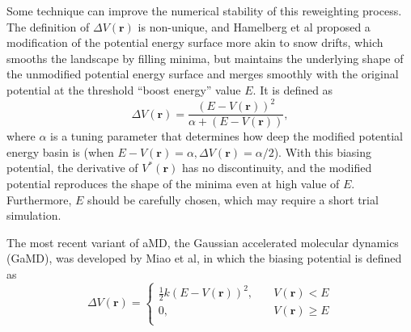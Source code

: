 Some technique can improve the numerical stability of this reweighting process.\cite{MiaoJCTC2014} The definition of $\Delta V(\mathbf{r})$ is non-unique, and Hamelberg et al proposed a modification of the potential energy surface more akin to snow drifts, which smooths the landscape by filling minima, but maintains the underlying shape of the unmodified potential energy surface and merges smoothly with the original potential at the threshold ``boost energy'' value $E$. It is defined as
\begin{equation}
	\Delta V(\mathbf{r})=\frac{(E-V(\mathbf{r}))^2}{\alpha+(E-V(\mathbf{r}))},
\end{equation}
where $\alpha$ is a tuning parameter that determines how deep the modified potential energy basin is (when $E-V(\mathbf{r})=\alpha, \Delta V(\mathbf{r})=\alpha/2$). With this biasing potential, the derivative of $V^{\ast}(\mathbf{r})$ has no discontinuity, and the modified potential reproduces the shape of the minima even at high value of $E$. Furthermore, $E$ should be carefully chosen, which may require a short trial simulation.

The most recent variant of aMD, the Gaussian accelerated molecular dynamics (GaMD), was developed by Miao et al\cite{MiaoJCTC2015}, in which the biasing potential is defined as
\begin{equation}
	\Delta V(\mathbf{r})= 
	\left\{ 
	\begin{array}{rl} 
		\frac{1}{2}k(E-V(\mathbf{r}))^2, &\quad V(\mathbf{r})< E\\ 
		0, &\quad V(\mathbf{r})\geq E\\  
	\end{array} 
	\right.
\end{equation}

